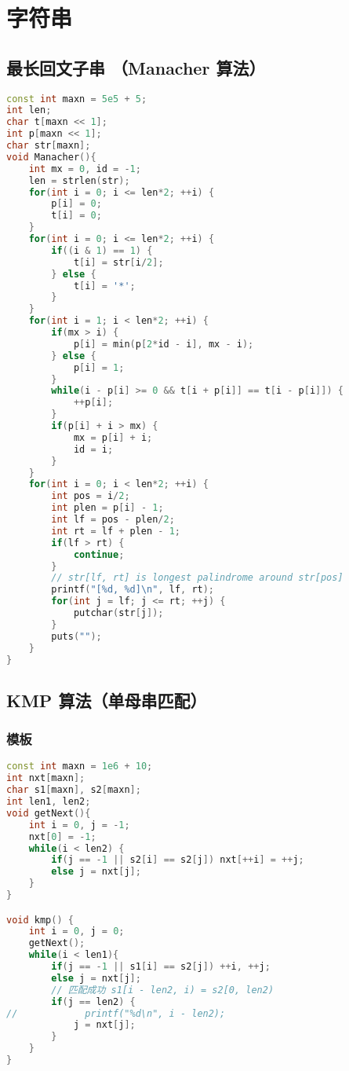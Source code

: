 

\section{字符串}

\subsection{最长回文子串 （Manacher 算法）}

\begin{lstlisting}[language=C++]
const int maxn = 5e5 + 5;
int len;
char t[maxn << 1];
int p[maxn << 1];
char str[maxn];
void Manacher(){
    int mx = 0, id = -1;
    len = strlen(str);
    for(int i = 0; i <= len*2; ++i) {
        p[i] = 0;
        t[i] = 0;
    }
    for(int i = 0; i <= len*2; ++i) {
        if((i & 1) == 1) {
            t[i] = str[i/2];
        } else {
            t[i] = '*';
        }
    }
    for(int i = 1; i < len*2; ++i) {
        if(mx > i) {
            p[i] = min(p[2*id - i], mx - i);
        } else {
            p[i] = 1;
        }
        while(i - p[i] >= 0 && t[i + p[i]] == t[i - p[i]]) {
            ++p[i];
        }
        if(p[i] + i > mx) {
            mx = p[i] + i;
            id = i;
        }
    }
    for(int i = 0; i < len*2; ++i) {
        int pos = i/2;
        int plen = p[i] - 1;
        int lf = pos - plen/2;
        int rt = lf + plen - 1;
        if(lf > rt) {
            continue;
        }
        // str[lf, rt] is longest palindrome around str[pos]
        printf("[%d, %d]\n", lf, rt);
        for(int j = lf; j <= rt; ++j) {
            putchar(str[j]);
        }
        puts("");
    }
}
\end{lstlisting}

\subsection{KMP 算法（单母串匹配）}

\subsubsection{模板}

\begin{lstlisting}[language=C++]
const int maxn = 1e6 + 10;
int nxt[maxn];
char s1[maxn], s2[maxn];
int len1, len2;
void getNext(){
    int i = 0, j = -1;
    nxt[0] = -1;
    while(i < len2) {
        if(j == -1 || s2[i] == s2[j]) nxt[++i] = ++j;
        else j = nxt[j];
    }
}

void kmp() {
    int i = 0, j = 0;
    getNext();
    while(i < len1){
        if(j == -1 || s1[i] == s2[j]) ++i, ++j;
        else j = nxt[j];
        // 匹配成功 s1[i - len2, i) = s2[0, len2)
        if(j == len2) { 
//            printf("%d\n", i - len2);
            j = nxt[j];
        }
    }
}
\end{lstlisting}

